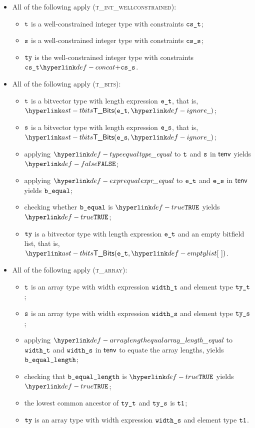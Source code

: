 \begin{itemize}
\begin{itemize}
    \item All of the following apply (\textsc{t\_int\_wellconstrained}):
    \begin{itemize}
      \item $\texttt{t}$ is a well-constrained integer type with constraints $\texttt{cs\_t}$;
      \item $\texttt{s}$ is a well-constrained integer type with constraints $\texttt{cs\_s}$;
      \item $\texttt{ty}$ is the well-constrained integer type with constraints $\cst \concat \css$.
    \end{itemize}

    \item All of the following apply (\textsc{t\_bits}):
    \begin{itemize}
      \item $\texttt{t}$ is a bitvector type with length expression $\texttt{e\_t}$, that is, $\TBits(\vet, \Ignore)$;
      \item $\texttt{s}$ is a bitvector type with length expression $\texttt{e\_s}$, that is, $\TBits(\ves, \Ignore)$;
      \item applying $\typeequal$ to $\texttt{t}$ and $\texttt{s}$ in $\textsf{tenv}$ yields $\False$;
      \item applying $\exprequal$ to $\texttt{e\_t}$ and $\texttt{e\_s}$ in $\textsf{tenv}$ yields $\texttt{b\_equal}$;
      \item checking whether $\texttt{b\_equal}$ is $\True$ yields $\True$\ProseTerminateAs{\NoLCA};
      \item $\texttt{ty}$ is a bitvector type with length expression $\texttt{e\_t}$ and an empty bitfield list, that is, $\TBits(\vet, \emptylist)$.
    \end{itemize}

    \item All of the following apply (\textsc{t\_array}):
    \begin{itemize}
      \item $\texttt{t}$ is an array type with width expression $\texttt{width\_t}$ and element type $\texttt{ty\_t}$;
      \item $\texttt{s}$ is an array type with width expression $\texttt{width\_s}$ and element type $\texttt{ty\_s}$;
      \item applying $\arraylengthequal$ to $\texttt{width\_t}$ and $\texttt{width\_s}$ in $\textsf{tenv}$ to equate the array lengths,
            yields $\texttt{b\_equal\_length}$\ProseOrTypeError;
      \item checking that $\texttt{b\_equal\_length}$ is $\True$ yields $\True$\ProseTerminateAs{\NoLCA};
      \item the lowest common ancestor of $\texttt{ty\_t}$ and $\texttt{ty\_s}$ is $\texttt{t1}$\ProseOrTypeError;
      \item $\texttt{ty}$ is an array type with width expression $\texttt{width\_s}$ and element type $\texttt{t1}$.
    \end{itemize}


\end{itemize}
\end{itemize}
